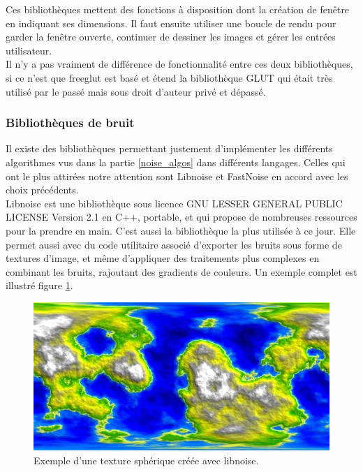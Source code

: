 \documentclass[a4paper]{article}
\begin{document}
    Ces bibliothèques mettent des fonctions à disposition dont la création de fenêtre en indiquant ses dimensions. Il faut ensuite utiliser une boucle de rendu pour garder la fenêtre ouverte, continuer de dessiner les images et gérer les entrées utilisateur.\\
    
    Il n'y a pas vraiment de différence de fonctionnalité entre ces deux bibliothèques, si ce n'est que freeglut est basé et étend la bibliothèque GLUT qui était très utilisé par le passé mais sous droit d'auteur privé et dépassé.

\subsubsection{Bibliothèques de bruit}
    
    Il existe des bibliothèques permettant justement d'implémenter les différents algorithmes vus dans la partie \ref{noise_algos} dans différents langages.
    Celles qui ont le plus attirées notre attention sont Libnoise \cite{LibNoise} et FastNoise \cite{FastNoise} en accord avec les choix précédents.\\

    Libnoise est une bibliothèque sous licence GNU LESSER GENERAL PUBLIC LICENSE Version 2.1 en C++, portable, et qui propose de nombreuses ressources pour la prendre en main. C'est aussi la bibliothèque la plus utilisée à ce jour. Elle permet aussi avec du code utilitaire associé d'exporter les bruits sous forme de textures d'image, et même d'appliquer des traitements plus complexes en combinant les bruits, rajoutant des gradients de couleurs. Un exemple complet est illustré figure \ref{libnoiseExample}.\\
    
    \begin{figure}[!ht]
        \begin{center} \includegraphics[width=\linewidth]{img/noise/libnoise_sphericalheightmap.jpg} \end{center}
        \caption{\label{libnoiseExample}Exemple d'une texture sphérique créée avec libnoise\protect\footnotemark .}
        \end{figure}
    
\end{document}
